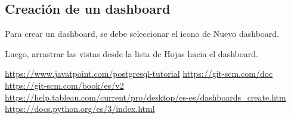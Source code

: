 \documentclass[a4paper, 12pt]{book}
\begin{document}
\subsection{Creación de un dashboard}
Para crear un dashboard, se debe seleccionar el icono de Nuevo dashboard.

Luego, arrastrar las vistas desde la lista de Hojas hacia el dashboard.



\begin{thebibliography}{0}
\bibitem{} \url{https://www.javatpoint.com/postgresql-tutorial} %
\bibitem{} \url{https://git-scm.com/doc} %
\bibitem{} \url{https://git-scm.com/book/es/v2} %
\bibitem{}  \url{https://help.tableau.com/current/pro/desktop/es-es/dashboards_create.htm}
\bibitem{} \url{https://docs.python.org/es/3/index.html}
\end{thebibliography}
\end{document}
